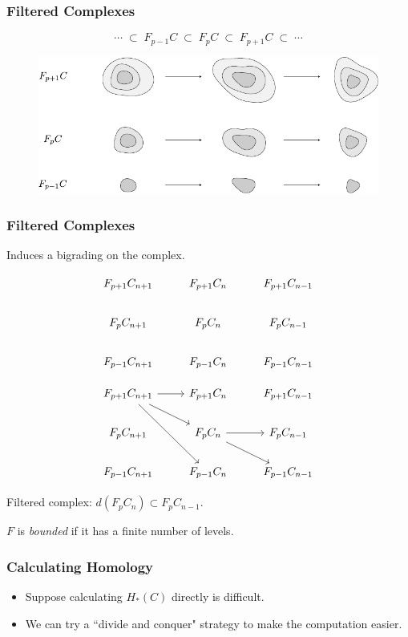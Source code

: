 \documentclass{beamer}
\begin{document}
\begin{frame}
	\frametitle{Filtered Complexes}

	\[
		\cdots \;\subset\; F_{p-1}C \;\subset\; F_{p}C \;\subset\; F_{p+1}C \;\subset\; \cdots
	\] 
	\vspace{5mm}
	\begin{figure}[H]
		\centering
		\includegraphics[scale=0.8]{fig/filtered-complex.pdf}
	\end{figure}
\end{frame}

\begin{frame}[fragile]
	\frametitle{Filtered Complexes}

	Induces a bigrading on the complex.
	\begin{overprint}
		\[
		\begin{tikzcd}
			F_{p+1}C_{n+1}&F_{p+1}C_{n}&F_{p+1}C_{n-1}\\
			F_{p}C_{n+1}&F_{p}C_{n}&F_{p}C_{n-1}\\
			F_{p-1}C_{n+1}&F_{p-1}C_{n}&F_{p-1}C_{n-1}
		\end{tikzcd}
		\] 

		\[
		\begin{tikzcd}
			F_{p+1}C_{n+1}\arrow[r]\arrow[dr]\arrow[ddr]&F_{p+1}C_{n}&F_{p+1}C_{n-1}\\
			F_{p}C_{n+1}&F_{p}C_{n}\rar\arrow[dr]&F_{p}C_{n-1}\\
			F_{p-1}C_{n+1}&F_{p-1}C_{n}&F_{p-1}C_{n-1}
		\end{tikzcd}
		\] 
	\end{overprint}
	\vfill

	 Filtered complex: $d(F_{p}C_{n}) \subset F_{p}C_{n-1}$.
	\vspace{5mm}

	 $F$ is \textit{bounded} if it has a finite number of levels.
\end{frame}

\begin{frame}
	\frametitle{Calculating Homology}

	\begin{itemize}
		\item Suppose calculating $H_{*}(C)$ directly is difficult.
		\item  We can try a ``divide and conquer" strategy to make the computation easier.
	\end{itemize}
\end{frame}
\end{document}
